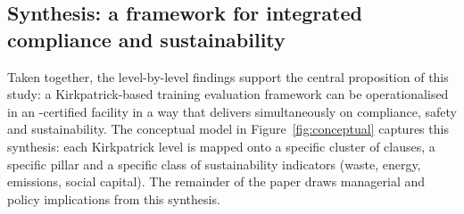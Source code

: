 \subsection{Synthesis: a framework for integrated compliance and sustainability}
\label{subsec:disc-synthesis}

Taken together, the level-by-level findings support the central proposition
of this study: a Kirkpatrick-based training evaluation framework can be
operationalised in an \AS{}-certified \MRO{} facility in a way that
delivers simultaneously on compliance, safety and sustainability. The
conceptual model in Figure~\ref{fig:conceptual} captures this synthesis:
each Kirkpatrick level is mapped onto a specific cluster of \AS{}
clauses, a specific \SMS{} pillar and a specific class of sustainability
indicators (waste, energy, emissions, social capital). The remainder of
the paper draws managerial and policy implications from this synthesis.
